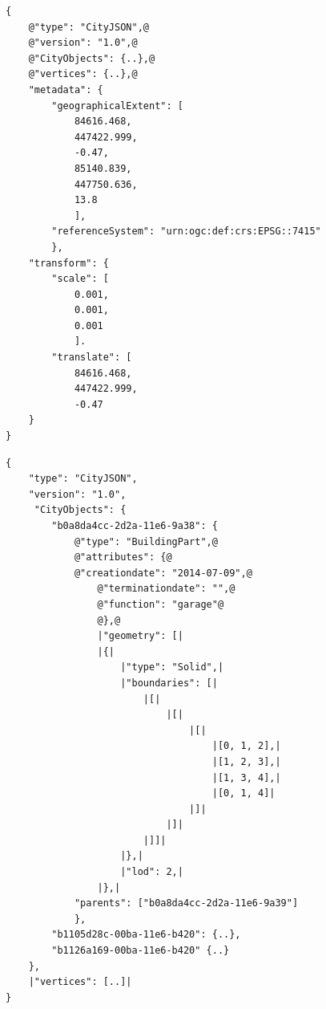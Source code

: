 \begin{scriptsize}
\hspace{-1.6cm}\begin{minipage}[c]{0.45\linewidth}


\begin{lstlisting}[frame=single,style=base,caption={Snippet of CityJSON structure, with mandatory members in orange}, label=ls:cj1]
{
    @"type": "CityJSON",@	
    @"version": "1.0",@	
    @"CityObjects": {..},@	
    @"vertices": {..},@	
    "metadata": {
        "geographicalExtent": [	
            84616.468,	
            447422.999,	
            -0.47,	
            85140.839,	
            447750.636,	
            13.8	
            ],	
        "referenceSystem": "urn:ogc:def:crs:EPSG::7415"	
        },	
    "transform": {	
        "scale": [	
            0.001,	
            0.001,	
            0.001	
            ].	
        "translate": [	
            84616.468,	
            447422.999,	
            -0.47		
    }
}
\end{lstlisting}


\end{minipage}
\hspace{0.2cm}
\begin{minipage}[c]{0.42\linewidth}


\begin{lstlisting}[frame=single,style=base,caption={Snippet of basic structure of CityObjects. Attributes in orange, geometries in green}, label=ls:cj2]
{
    "type": "CityJSON",
    "version": "1.0",
     "CityObjects": {
        "b0a8da4cc-2d2a-11e6-9a38": {
            @"type": "BuildingPart",@	
            @"attributes": {@	
            @"creationdate": "2014-07-09",@	
                @"terminationdate": "",@	
                @"function": "garage"@	
                @},@	
                |"geometry": [|	
                |{|	
                    |"type": "Solid",|	
                    |"boundaries": [|	
                        |[|	
                            |[|	
                                |[|	
                                    |[0, 1, 2],|	
                                    |[1, 2, 3],|	
                                    |[1, 3, 4],|	
                                    |[0, 1, 4]|	
                                |]|	
                            |]|	
                        |]]|	
                    |},|	
                    |"lod": 2,|	
                |},|	
            "parents": ["b0a8da4cc-2d2a-11e6-9a39"]
            },
        "b1105d28c-00ba-11e6-b420": {..},
        "b1126a169-00ba-11e6-b420" {..}
    },
    |"vertices": [..]|
}
\end{lstlisting}



\end{minipage}
\end{scriptsize}
